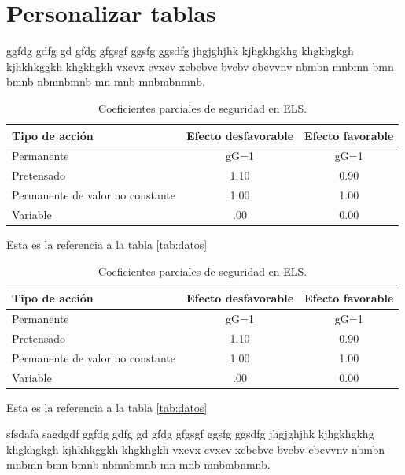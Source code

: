 \documentclass[a4paper,11pt]{article}
\begin{document}
	\section{Personalizar tablas}
	
	ggfdg gdfg gd gfdg gfgsgf ggsfg ggsdfg jhgjghjhk kjhgkhgkhg khgkhgkgh kjhkhkggkh khgkhgkh vxcvx cvxcv xcbcbvc bvcbv cbcvvnv nbmbn mnbmn bmn bmnb nbmnbmnb mn mnb mnbmbnmnb.
	
	\begin{table}[h]
		\centering
		\caption{Coeficientes parciales de seguridad en ELS.}
		\begin{tabular}{p{4cm}cc}
			\hline \textbf{Tipo de acción} & \textbf{Efecto desfavorable} & \textbf{Efecto favorable} \\
			\hline Permanente & gG=1 & gG=1 \\
			\hline Pretensado & 1.10 & 0.90 \\
			\hline Permanente de valor no constante & 1.00 & 1.00 \\
			\hline Variable &.00 & 0.00 \\
			\hline
		\end{tabular}
		\label{tab:coeficientes1}
	\end{table}
	
	Esta es la referencia a la tabla \ref{tab:datos}
	
	\begin{table}[h]
		\centering
		\caption{Coeficientes parciales de seguridad en ELS.}
		\begin{tabular}{p{4cm}cc}
			\toprule %
			\hline \textbf{Tipo de acción} & \textbf{Efecto desfavorable} & \textbf{Efecto favorable} \\
			\midrule %
			Permanente & gG=1 & gG=1 \\
			Pretensado & 1.10 & 0.90 \\
			Permanente de valor no constante & 1.00 & 1.00 \\
			Variable &.00 & 0.00 \\
			\bottomrule %
		\end{tabular}
		\label{tab:coeficientes2}
	\end{table}
	
	Esta es la referencia a la tabla \ref{tab:datos}
	
	
	sfsdafa sagdgdf ggfdg gdfg gd gfdg gfgsgf ggsfg ggsdfg jhgjghjhk kjhgkhgkhg khgkhgkgh kjhkhkggkh khgkhgkh vxcvx cvxcv xcbcbvc bvcbv cbcvvnv nbmbn mnbmn bmn bmnb nbmnbmnb mn mnb mnbmbnmnb.
	
\end{document}
